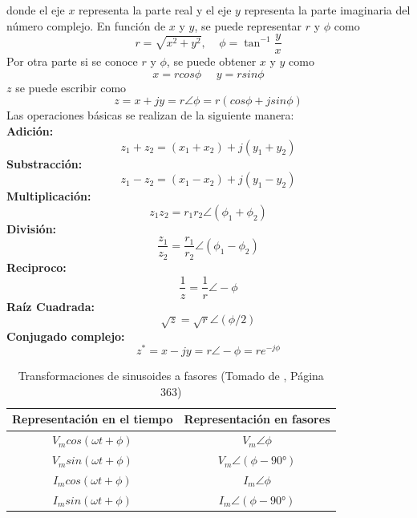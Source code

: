 \documentclass[twocolumn]{IEEEtran}
\begin{document}
\noindent
donde el eje $x$ representa la parte real y el eje $y$ representa la parte imaginaria del número complejo. En función de $x$ y $y$, se puede representar $r$ y $\phi$ como
\begin{equation}
 r = \sqrt{x^2 + y^2}, \ \ \ \ \ \phi = {\tan ^{ - 1}}\frac{y}{x} 
\label{ecu14}
\end{equation}
\noindent
Por otra parte si se conoce $r$ y $\phi$, se puede obtener $x$ y $y$ como
\begin{equation}
 x = r cos \phi \ \ \ \ \ \ y = r sin \phi
\label{ecu15}
\end{equation}
\noindent
$z$ se puede escribir como
\begin{equation}
 z = x + jy = r \angle \phi = r(cos \phi + j sin \phi)
\label{ecu16}
\end{equation}
\noindent
Las operaciones básicas se realizan de la siguiente manera:\\
\textbf{Adición:}
\begin{equation}
 z_1 + z_2 = (x_1 + x_2)+ j(y_1 + y_2)
\label{ecu17}
\end{equation}
\noindent
\textbf{Substracción:}
\begin{equation}
 z_1 - z_2 = (x_1 - x_2)+ j(y_1 - y_2)
\label{ecu18}
\end{equation}
\noindent
\textbf{Multiplicación:}
\begin{equation}
 z_1 z_2 = r_1 r_2 \angle (\phi _1 + \phi _2)
\label{ecu19}
\end{equation}
\noindent
\textbf{División:}
\begin{equation}
 \frac{z_1}{z_2} = \frac{r_1}{r_2} \angle (\phi _1 - \phi _2)
\label{ecu20}
\end{equation}
\noindent
\textbf{Reciproco:}
\begin{equation}
 \frac{1}{z} = \frac{1}{r} \angle -\phi
\label{ecu21}
\end{equation}
\noindent
\textbf{Raíz Cuadrada:}
\begin{equation}
 \sqrt{z} = \sqrt{r} \angle (\phi /2)
\label{ecu22}
\end{equation}
\noindent
\textbf{Conjugado complejo:}
\begin{equation}
 z^{*} = x -jy = r \angle - \phi = r{e^{-j\phi }}
\label{ecu23}
\end{equation}
\begin{table}[H]
	\centering
\begin{tabular}[c]{|c|c|} \hline
Representación en el tiempo & Representación en fasores \\ \hline
$V_m cos (\omega t + \phi)$ & $V_m \angle \phi$ \\
$V_m sin (\omega t + \phi)$ & $V_m \angle (\phi- 90°)$ \\
$I_m cos (\omega t + \phi)$ & $I_m \angle \phi$ \\
$I_m sin (\omega t + \phi)$ & $I_m \angle (\phi- 90°)$ \\ \hline
\end{tabular}
	\caption{Transformaciones de sinusoides a fasores (Tomado de \cite{sadiku}, Página 363)}
	\label{tab1}
\end{table}
\end{document}
